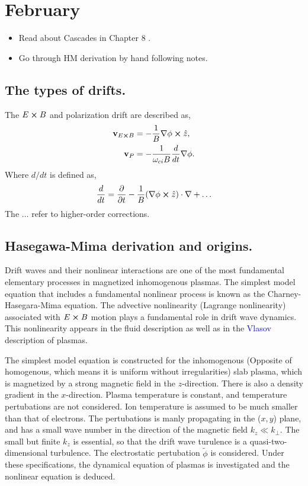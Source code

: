 \section{February}

\begin{itemize}
	\item Read about Cascades in Chapter 8 \cite{diamond_itoh_itoh_2010}.
	\item Go through HM derivation by hand following notes.  
\end{itemize}

\subsection{The types of drifts.}
The $E \cross B$ and polarization drift are described as, 
\begin{align}
	\bold{v}_{E \cross B} &= -\frac{1}{B} \nabla \phi \cross \hat{z}, \\
	\bold{v}_{P} &= - \frac{1}{\omega_{ci} B} \frac{d}{dt} \nabla \phi. 
\end{align}
Where $d/dt$ is defined as, 
\begin{align}
	\frac{d}{dt} = \frac{\partial}{\partial t} - \frac{1}{B} (\nabla \phi \cross \hat{z}) \cdot \nabla + \dots
\end{align}
The $\dots$ refer to higher-order corrections. 


\subsection{Hasegawa-Mima derivation and origins.}
Drift waves and their nonlinear interactions are one of the most fundamental elementary processes in magnetized inhomogenous plasmas. The simplest model equation that includes a fundamental nonlinear process is known as the Charney-Hasegara-Mima equation. The advective nonlinearity (Lagrange nonlinearity) associated with $E \cross B$ motion plays a fundamental role in drift wave dynamics. This nonlinearity appears in the fluid description as well as in the \textcolor{blue}{Vlasov} description of plasmas.

The simplest model equation is constructed for the inhomogenous (Opposite of homogenous, which means it is uniform without irregularities) slab plasma, which is magnetized by a strong magnetic field in the $z$-direction. There is also a density gradient in the $x$-direction. Plasma temperature is constant, and temperature pertubations are not considered. Ion temperature is assumed to be much smaller than that of electrons. The pertubations is manly propagating in the ($x,y$) plane, and has a small wave number in the direction of the magnetic field $k_z \ll k_{\perp}$. The small but finite $k_z$ is essential, so that the drift wave turulence is a quasi-two-dimensional turbulence. The electrostatic pertubation $\tilde{\phi}$ is considered. Under these specifications, the dynamical equation of plasmas is investigated and the nonlinear equation is deduced. 

